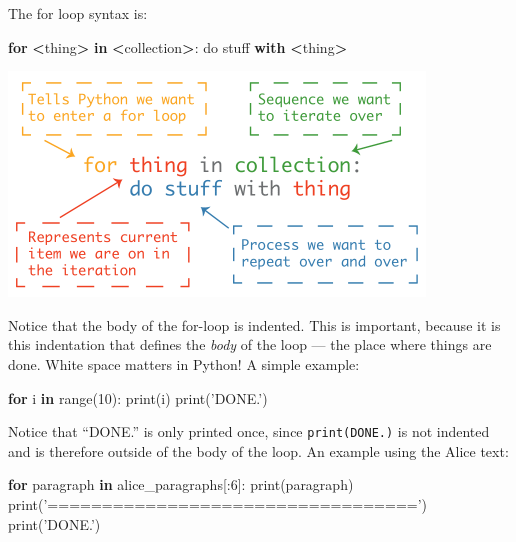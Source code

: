 \documentclass[]{book}
\newenvironment{Shaded}{\begin{snugshade}}{\end{snugshade}}
\newcommand{\BuiltInTok}[1]{#1}
\newcommand{\ControlFlowTok}[1]{\textcolor[rgb]{0.13,0.29,0.53}{\textbf{#1}}}
\newcommand{\DecValTok}[1]{\textcolor[rgb]{0.00,0.00,0.81}{#1}}
\newcommand{\KeywordTok}[1]{\textcolor[rgb]{0.13,0.29,0.53}{\textbf{#1}}}
\newcommand{\NormalTok}[1]{#1}
\newcommand{\OperatorTok}[1]{\textcolor[rgb]{0.81,0.36,0.00}{\textbf{#1}}}
\newcommand{\StringTok}[1]{\textcolor[rgb]{0.31,0.60,0.02}{#1}}
\begin{document}
The for loop syntax is:

\begin{Shaded}
\begin{Highlighting}[]
\ControlFlowTok{for} \OperatorTok{<}\NormalTok{thing}\OperatorTok{>} \KeywordTok{in} \OperatorTok{<}\NormalTok{collection}\OperatorTok{>}\NormalTok{: }
\NormalTok{    do stuff }\ControlFlowTok{with} \OperatorTok{<}\NormalTok{thing}\OperatorTok{>}
\end{Highlighting}
\end{Shaded}

\includegraphics{Python/PythonIntro/images/python_for_loop_small.png}

Notice that the body of the for-loop is indented. This is important, because it is this indentation that defines the \emph{body} of the loop --- the place where things are done. White space matters in Python! A simple example:

\begin{Shaded}
\begin{Highlighting}[]
\ControlFlowTok{for}\NormalTok{ i }\KeywordTok{in} \BuiltInTok{range}\NormalTok{(}\DecValTok{10}\NormalTok{): }
    \BuiltInTok{print}\NormalTok{(i)}
\BuiltInTok{print}\NormalTok{(}\StringTok{'DONE.'}\NormalTok{)    }
\end{Highlighting}
\end{Shaded}

Notice that ``DONE.'' is only printed once, since \texttt{print(\textquotesingle{}DONE.\textquotesingle{})} is not indented and is therefore outside of the body of the loop. An example using the Alice text:

\begin{Shaded}
\begin{Highlighting}[]
\ControlFlowTok{for}\NormalTok{ paragraph }\KeywordTok{in}\NormalTok{ alice_paragraphs[:}\DecValTok{6}\NormalTok{]:}
    \BuiltInTok{print}\NormalTok{(paragraph)}
    \BuiltInTok{print}\NormalTok{(}\StringTok{'=================================='}\NormalTok{)}
\BuiltInTok{print}\NormalTok{(}\StringTok{'DONE.'}\NormalTok{)}
\end{Highlighting}
\end{Shaded}
\end{document}
